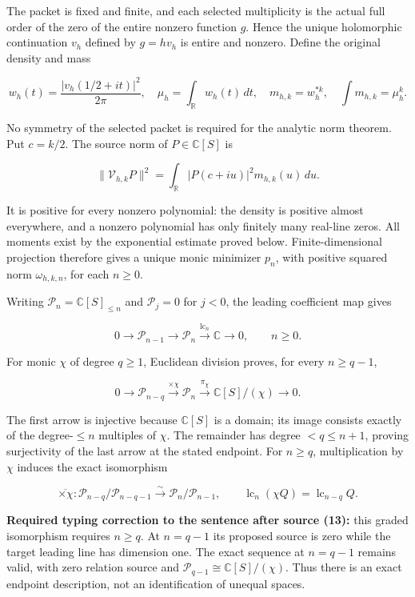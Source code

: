 The packet is fixed and finite, and each selected multiplicity is the actual full order of the zero of the entire nonzero function \(g\). Hence the unique holomorphic continuation \(v_h\) defined by \(g=hv_h\) is entire and nonzero. Define the original density and mass

\[
w_h(t)=\frac{|v_h(1/2+it)|^2}{2\pi},\quad
\mu_h=\int_{\mathbb R}w_h(t)\,dt,\quad
m_{h,k}=w_h^{*k},\quad \int m_{h,k}=\mu_h^k.
\]

No symmetry of the selected packet is required for the analytic norm theorem. Put \(c=k/2\). The source norm of \(P\in\mathbb C[S]\) is

\[
\|\mathcal V_{h,k}P\|^2=\int_{\mathbb R}|P(c+iu)|^2m_{h,k}(u)\,du.
\]

It is positive for every nonzero polynomial: the density is positive almost everywhere, and a nonzero polynomial has only finitely many real-line zeros. All moments exist by the exponential estimate proved below. Finite-dimensional projection therefore gives a unique monic minimizer \(p_n\), with positive squared norm \(\omega_{h,k,n}\), for each \(n\ge0\).

Writing \(\mathcal P_n=\mathbb C[S]_{\le n}\) and \(\mathcal P_j=0\) for \(j<0\), the leading coefficient map gives

\[
0\longrightarrow\mathcal P_{n-1}\longrightarrow\mathcal P_n
\xrightarrow{\operatorname{lc}_n}\mathbb C\longrightarrow0,
\qquad n\ge0.
\]

For monic \(\chi\) of degree \(q\ge1\), Euclidean division proves, for every \(n\ge q-1\),

\[
0\longrightarrow\mathcal P_{n-q}\xrightarrow{\times\chi}\mathcal P_n
\xrightarrow{\pi_\chi}\mathbb C[S]/(\chi)\longrightarrow0.
\]

The first arrow is injective because \(\mathbb C[S]\) is a domain; its image consists exactly of the degree-\(\le n\) multiples of \(\chi\). The remainder has degree \(<q\le n+1\), proving surjectivity of the last arrow at the stated endpoint. For \(n\ge q\), multiplication by \(\chi\) induces the exact isomorphism

\[
\overline{\times\chi}:\mathcal P_{n-q}/\mathcal P_{n-q-1}
\xrightarrow{\sim}\mathcal P_n/\mathcal P_{n-1},\qquad
\operatorname{lc}_n(\chi Q)=\operatorname{lc}_{n-q}Q.
\]

\textbf{Required typing correction to the sentence after source (13):} this graded isomorphism requires \(n\ge q\). At \(n=q-1\) its proposed source is zero while the target leading line has dimension one. The exact sequence at \(n=q-1\) remains valid, with zero relation source and \(\mathcal P_{q-1}\cong\mathbb C[S]/(\chi)\). Thus there is an exact endpoint description, not an identification of unequal spaces.

